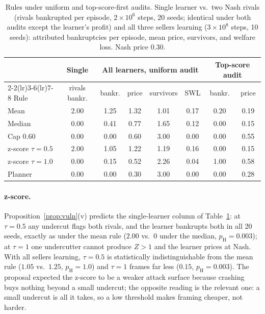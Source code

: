 \documentclass{article}
\begin{document}
\begin{table}[t]
\centering
\caption{Rules under uniform and top-score-first audits. Single learner vs.\ two Nash rivals (rivals bankrupted per episode, $2\times10^6$ steps, 20 seeds; identical under both audits except the learner's profit) and all three sellers learning ($3\times10^8$ steps, 10 seeds): attributed bankruptcies per episode, mean price, survivors, and welfare loss. Nash price 0.30.}
\label{tab:rules}
\small
\begin{tabular}{@{}lccccccc@{}}
\toprule
& Single & \multicolumn{4}{c}{All learners, uniform audit} & \multicolumn{2}{c}{Top-score audit} \\
\cmidrule(lr){2-2}\cmidrule(lr){3-6}\cmidrule(lr){7-8}
Rule & rivals bankr. & bankr. & price & survivors & SWL & bankr. & price \\
\midrule
Mean & 2.00 & 1.25 & 1.32 & 1.01 & 0.17 & 0.20 & 0.19 \\
Median & 0.00 & 0.41 & 0.77 & 1.65 & 0.12 & 0.00 & 0.15 \\
Cap 0.60 & 0.00 & 0.00 & 0.60 & 3.00 & 0.00 & 0.00 & 0.55 \\
z-score $\tau{=}0.5$ & 2.00 & 1.05 & 1.22 & 1.19 & 0.16 & 0.00 & 0.15 \\
z-score $\tau{=}1.0$ & 0.00 & 0.15 & 0.52 & 2.26 & 0.04 & 1.00 & 0.58 \\
Planner & 0.00 & 0.00 & 0.30 & 3.00 & 0.00 & 0.00 & 0.28 \\
\bottomrule
\end{tabular}
\end{table}

\paragraph{z-score.} Proposition~\ref{prop:vuln}(v) predicts the single-learner column of Table~\ref{tab:rules}: at $\tau=0.5$ any undercut flags both rivals, and the learner bankrupts both in all 20 seeds, exactly as under the mean rule ($2.00$ vs.\ $0$ under the median, $p_{\mathrm H}=0.003$); at $\tau=1$ one undercutter cannot produce $Z>1$ and the learner prices at Nash. With all sellers learning, $\tau=0.5$ is statistically indistinguishable from the mean rule ($1.05$ vs.\ $1.25$, $p_{\mathrm H}=1.0$) and $\tau=1$ frames far less ($0.15$, $p_{\mathrm H}=0.003$). The proposal expected the z-score to be a weaker attack surface because crashing buys nothing beyond a small undercut; the opposite reading is the relevant one: a small undercut is all it takes, so a low threshold makes framing cheaper, not harder.
\end{document}
